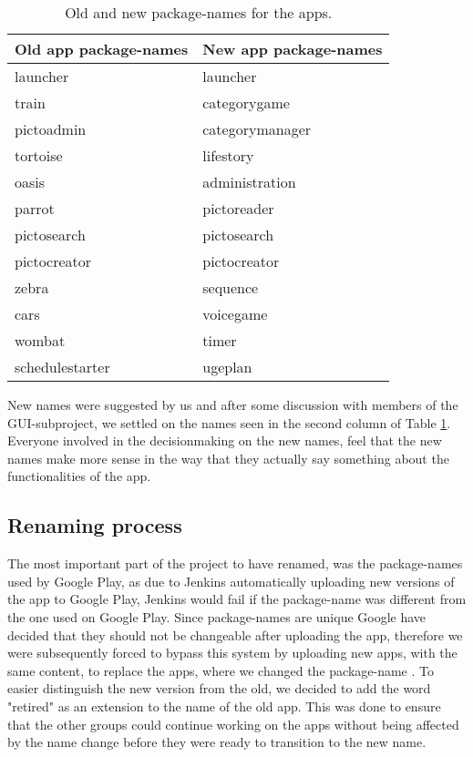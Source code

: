 \begin{table}
	\centering
	\begin{tabular}{ll}
		\textbf{Old app package-names} & \textbf{New app package-names}\\ \hline \noalign{\vskip 2mm}
		launcher & launcher\\ \hline
		train & categorygame\\ \hline
		pictoadmin & categorymanager\\ \hline
		tortoise & lifestory\\ \hline
		oasis & administration\\ \hline
		parrot & pictoreader\\ \hline
		pictosearch & pictosearch\\ \hline
		pictocreator & pictocreator\\ \hline
		zebra & sequence\\ \hline
		cars & voicegame\\ \hline
		wombat & timer\\ \hline
		schedulestarter & ugeplan\\ \hline
	\end{tabular}
	\caption{Old and new package-names for the apps.}
	\label{Sprint3_package_names_apps}
\end{table}

New names were suggested by us and after some discussion with members of the GUI-subproject, we settled on the names seen in the second column of Table \ref{Sprint3_package_names_apps}. Everyone involved in the decisionmaking on the new names, feel that the new names make more sense in the way that they actually say something about the functionalities of the app.

\subsection{Renaming process}
The most important part of the project to have renamed, was the package-names used by Google Play, as due to Jenkins automatically uploading new versions of the app to Google Play, Jenkins would fail if the package-name was different from the one used on Google Play. Since package-names are unique Google have decided that they should not be changeable after uploading the app, therefore we were subsequently forced to bypass this system by uploading new apps, with the same content, to replace the apps, where we changed the package-name \citep{PackageName}. To easier distinguish the new version from the old, we decided to add the word "retired" as an extension to the name of the old app. This was done to ensure that the other groups could continue working on the apps without being affected by the name change before they were ready to transition to the new name.

